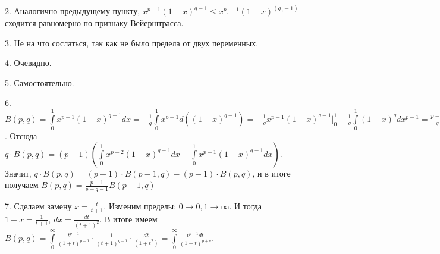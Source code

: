 2. Аналогично предыдущему пункту,
$x^{p-1}(1-x)^{q-1}\leqslant x^{p_0-1}(1-x)^(q_0-1)$ - 
сходится равномерно по признаку Вейерштрасса.

3. Не на что сослаться, так как не было предела от двух переменных.

4. Очевидно.

5. Самостоятельно.

6.  $B(p,q)=\int\limits_{0}^{1}x^{p-1}(1-x)^{q-1}dx=
-\frac{1}{q}\int\limits_{0}^{1}x^{p-1}d((1-x)^{q-1})=
-\frac{1}{q}x^{p-1}(1-x)^{q-1}\big|^1_0+\frac{1}{q}\int\limits_{0}^{1}
(1-x)^{q}dx^{p-1}=\frac{p-1}{q}\int\limits_{0}^{1}x^{p-2}(1-x)^{q-1}(1-x)dx$.
Отсюда $q\cdot B(p,q)=(p-1)\left(
 \int\limits_{0}^{1}x^{p-2}(1-x)^{q-1}dx-
\int\limits_{0}^{1}x^{p-1}(1-x)^{q-1}dx\right)$. Значит,
$q\cdot B(p,q)=(p-1)\cdot B(p-1,q)-(p-1)\cdot B(p,q)$, и в итоге получаем
$B(p,q)=\frac{p-1}{p+q-1}B(p-1,q)$

7. Сделаем замену $x=\frac{t}{t+1}$. Изменим пределы: 
$0\to 0,1\to \infty$. И тогда $1-x=\frac{1}{t+1}$, $dx=\frac{dt}{(t+1)^2}$.
В итоге имеем $B(p,q)=\int\limits_{0}^{\infty} \frac{t^{p-1}}{(1+t)^{p-1}}
\cdot \frac{1}{(t+1)^{q-1}}\cdot \frac{dt}{(1+t^2)}=
\int\limits_{0}^{\infty} \frac{t^{p-1}dt}{(1+t)^{p+q}}$. 

